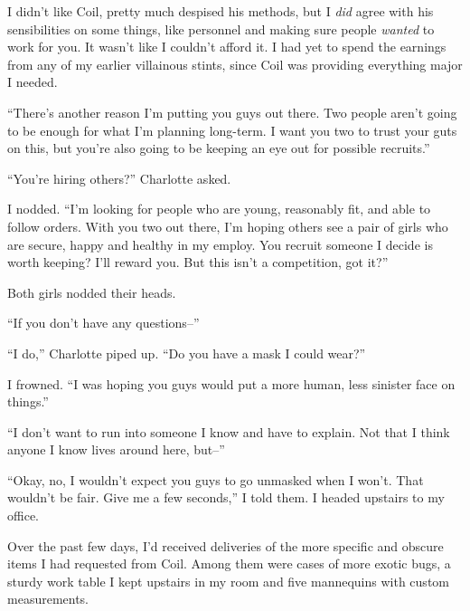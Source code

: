 I didn't like Coil, pretty much despised his methods, but I \emph{did} agree with his sensibilities on some things, like personnel and making sure people \emph{wanted} to work for you.  It wasn't like I couldn't afford it.  I had yet to spend the earnings from any of my earlier villainous stints, since Coil was providing everything major I needed.



``There's another reason I'm putting you guys out there.  Two people aren't going to be enough for what I'm planning long-term.  I want you two to trust your guts on this, but you're also going to be keeping an eye out for possible recruits.''



``You're hiring others?'' Charlotte asked.



I nodded.  ``I'm looking for people who are young, reasonably fit, and able to follow orders.  With you two out there, I'm hoping others see a pair of girls who are secure, happy and healthy in my employ.  You recruit someone I decide is worth keeping?  I'll reward you.  But this isn't a competition, got it?''



Both girls nodded their heads.



``If you don't have any questions--''



``I do,'' Charlotte piped up.  ``Do you have a mask I could wear?''



I frowned.  ``I was hoping you guys would put a more human, less sinister face on things.''



``I don't want to run into someone I know and have to explain.  Not that I think anyone I know lives around here, but--''



``Okay, no, I wouldn't expect you guys to go unmasked when I won't.  That wouldn't be fair.  Give me a few seconds,'' I told them.  I headed upstairs to my office.



Over the past few days, I'd received deliveries of the more specific and obscure items I had requested from Coil.  Among them were cases of more exotic bugs, a sturdy work table I kept upstairs in my room and five mannequins with custom measurements.



